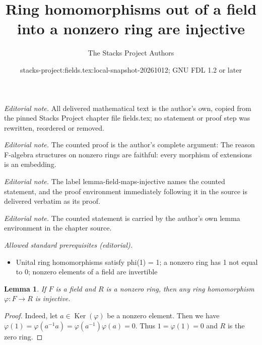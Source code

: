 \documentclass[10pt,a4paper]{amsart}
\title{Ring homomorphisms out of a field into a nonzero ring are injective}
\author{The Stacks Project Authors}
\date{stacks-project:fields.tex:local-snapshot-20261012; GNU FDL 1.2 or later}
\theoremstyle{plain}
\newtheorem{lemma}[subsection]{Lemma}
\theoremstyle{definition}
\theoremstyle{remark}
\numberwithin{equation}{subsection}
\def\Ker{\mathop{\mathrm{Ker}}}
\begin{document}
\maketitle
\noindent\textit{Editorial note.} All delivered mathematical text is the author's own, copied from the pinned Stacks Project chapter file fields.tex; no statement or proof step was rewritten, reordered or removed.\par\medskip
\noindent\textit{Editorial note.} The counted proof is the author's complete argument: The reason F-algebra structures on nonzero rings are faithful: every morphism of extensions is an embedding.\par\medskip
\noindent\textit{Editorial note.} The label lemma-field-maps-injective names the counted statement, and the proof environment immediately following it in the source is delivered verbatim as its proof.\par\medskip
\noindent\textit{Editorial note.} The counted statement is carried by the author's own lemma environment in the chapter source.\par\medskip
\noindent\textit{Allowed standard prerequisites (editorial).}\begin{itemize}
\item Unital ring homomorphisms satisfy phi(1) = 1; a nonzero ring has 1 not equal to 0; nonzero elements of a field are invertible
\end{itemize}\medskip
\begin{lemma}
\label{lemma-field-maps-injective}
If $F$ is a field and $R$ is a nonzero ring, then any ring homomorphism
$\varphi : F \to R$ is injective.
\end{lemma}

\begin{proof}
Indeed, let $a \in \Ker(\varphi)$ be a nonzero element. Then we have
$\varphi(1) = \varphi(a^{-1} a) = \varphi(a^{-1}) \varphi(a) = 0$.
Thus $1 = \varphi(1) = 0$ and $R$ is the zero ring.
\end{proof}
\end{document}
